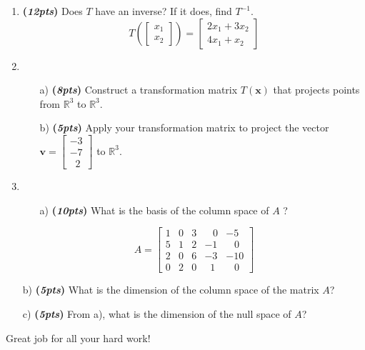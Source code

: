 \documentclass[12pt]{article}%
\begin{document}
\begin{enumerate}
    
    \item \textbf{(\emph{12pts})} Does \(T\) have an inverse?
    If it does, find \(T^{-1}\).
    \[
    T\left( \begin{bmatrix} x_1\\x_2\end{bmatrix} \right) = 
    \begin{bmatrix} 2x_1 + 3x_2 \\ 4x_1 + x_2\end{bmatrix}
    \]
    
    
    
    \vspace{7cm}
    

    \item \begin{itemize}
        \item[a)] \textbf{(\emph{8pts})} Construct a transformation matrix \(T(\mathbf{x})\) that projects points from \(\mathbb{R}^3\) to \(\mathbb{R}^3\).
        \vspace{2cm}
        \item[b)] \textbf{(\emph{5pts})} Apply your transformation matrix to project the vector \(\mathbf{v}=\begin{bmatrix}
            -3\\-7\\\;\;2
        \end{bmatrix}\) to \(\mathbb{R}^3\).
    \end{itemize}
    \vspace{3cm}


    
    
    
    \item
    \begin{itemize}
        \item[a)]\textbf{(\emph{10pts})} What is the basis of the column space of \(A\) ?
    \end{itemize} 
            \[
            A = \begin{bmatrix}
                1 & 0 & 3 & \;\;\;0 & -5 \\
                5 & 1 & 2 & -1  & \;\;\;0 \\
                2 & 0 & 6 & -3 & -10 \\
                0 & 2 & 0 & \;\;1 & \;\;\;0
            \end{bmatrix}
            \]
         \item[b)]\textbf{(\emph{5pts})} What is the dimension of the column space of the matrix \(A\)?
        \item[c)]\textbf{(\emph{5pts})} From a), what is the dimension of the null space of \(A\)?

     
  
    
\end{enumerate}

\vspace{12.5cm}

\begin{center}
    Great job for all your hard work!
\end{center}
\end{document}
